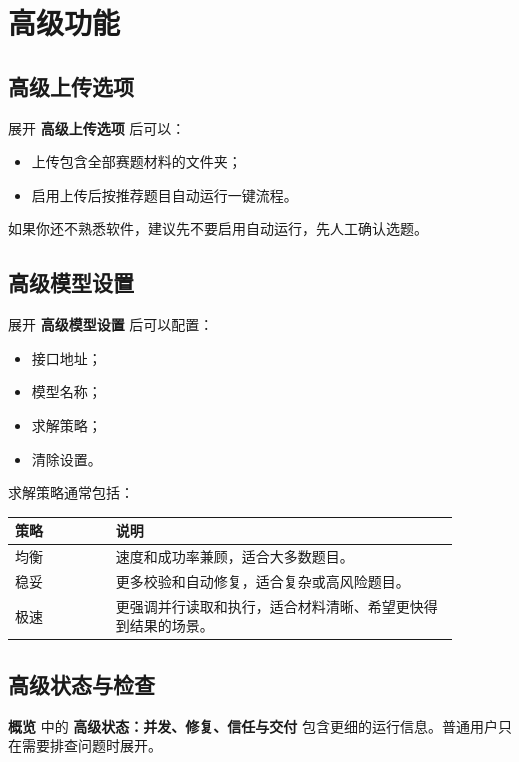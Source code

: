 \documentclass[UTF8,a4paper,12pt]{ctexart}
\newcommand{\menu}[1]{\textbf{#1}}
\begin{document}
\section{高级功能}

\subsection{高级上传选项}

展开 \menu{高级上传选项} 后可以：

\begin{itemize}
  \item 上传包含全部赛题材料的文件夹；
  \item 启用上传后按推荐题目自动运行一键流程。
\end{itemize}

如果你还不熟悉软件，建议先不要启用自动运行，先人工确认选题。

\subsection{高级模型设置}

展开 \menu{高级模型设置} 后可以配置：

\begin{itemize}
  \item 接口地址；
  \item 模型名称；
  \item 求解策略；
  \item 清除设置。
\end{itemize}

求解策略通常包括：

\begin{longtable}{p{0.2\linewidth}p{0.68\linewidth}}
\toprule
策略 & 说明 \\
\midrule
均衡 & 速度和成功率兼顾，适合大多数题目。 \\
稳妥 & 更多校验和自动修复，适合复杂或高风险题目。 \\
极速 & 更强调并行读取和执行，适合材料清晰、希望更快得到结果的场景。 \\
\bottomrule
\end{longtable}

\subsection{高级状态与检查}

\menu{概览} 中的 \menu{高级状态：并发、修复、信任与交付} 包含更细的运行信息。普通用户只在需要排查问题时展开。
\end{document}
